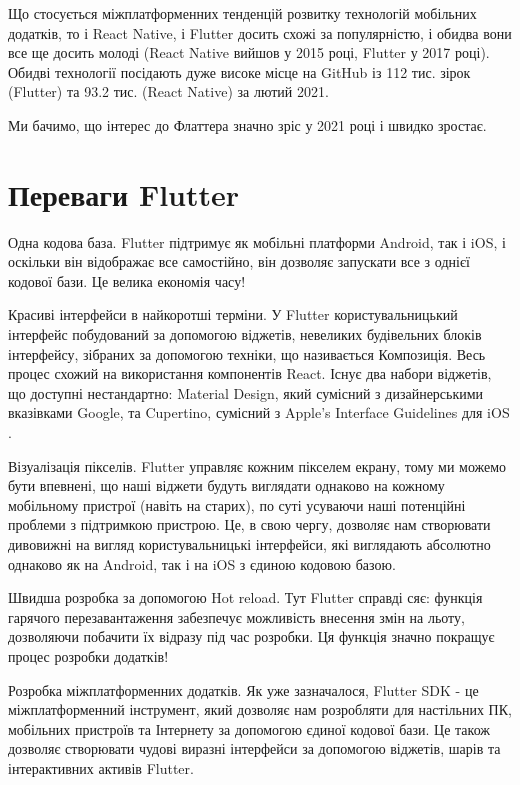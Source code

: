 Що стосується міжплатформенних тенденцій розвитку технологій мобільних додатків, то і React Native, і Flutter досить схожі за популярністю, і обидва вони все ще досить молоді (React Native вийшов у 2015 році, Flutter у 2017 році).
Обидві технології посідають дуже високе місце на GitHub із 112 тис. зірок (Flutter) \cite{flutter_gihtub} та 93.2 тис. (React Native) \cite{rn_gihtub} за лютий 2021.

Ми бачимо, що інтерес до Флаттера значно зріс у 2021 році і швидко зростає.

\section{Переваги Flutter}\label{section.1.3}
\begin{enumerate}
    \begin{item}
        Одна кодова база.
        Flutter підтримує як мобільні платформи Android, так і iOS, і оскільки він відображає все самостійно, він дозволяє запускати все з однієї кодової бази.
        Це велика економія часу!
    \end{item}
    \begin{item}
        Красиві інтерфейси в найкоротші терміни.
        У Flutter користувальницький інтерфейс побудований за допомогою віджетів, невеликих будівельних блоків інтерфейсу, зібраних за допомогою техніки, що називається Композиція.
        Весь процес схожий на використання компонентів React.
        Існує два набори віджетів, що доступні нестандартно: Material Design, який сумісний з дизайнерськими вказівками Google, та Cupertino, сумісний з Apple's Interface Guidelines для iOS .
    \end{item}
    \begin{item}
        Візуалізація пікселів.
        Flutter управляє кожним пікселем екрану, тому ми можемо бути впевнені, що наші віджети будуть виглядати однаково на кожному мобільному пристрої (навіть на старих), по суті усуваючи наші потенційні проблеми з підтримкою пристрою.
        Це, в свою чергу, дозволяє нам створювати дивовижні на вигляд користувальницькі інтерфейси, які виглядають абсолютно однаково як на Android, так і на iOS з єдиною кодовою базою.
    \end{item}
    \begin{item}
        Швидша розробка за допомогою Hot reload.
        Тут Flutter справді сяє: функція гарячого перезавантаження забезпечує можливість внесення змін на льоту, дозволяючи побачити їх відразу під час розробки.
        Ця функція значно покращує процес розробки додатків!
    \end{item}
    \begin{item}
        Розробка міжплатформенних додатків.
        Як уже зазначалося, Flutter SDK - це міжплатформенний інструмент, який дозволяє нам розробляти для настільних ПК, мобільних пристроїв та Інтернету за допомогою єдиної кодової бази.
        Це також дозволяє створювати чудові виразні інтерфейси за допомогою віджетів, шарів та інтерактивних активів Flutter.
    \end{item}
\end{enumerate}

